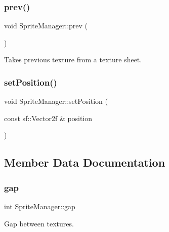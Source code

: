 \mbox{\label{class_sprite_manager_a45d2b2613bb95d34ce8e0ad28e261ef1}} 
\subsubsection{\texorpdfstring{prev()}{prev()}}
{\footnotesize\ttfamily void Sprite\+Manager\+::prev (\begin{DoxyParamCaption}{ }\end{DoxyParamCaption})}



Takes previous texture from a texture sheet. 

\mbox{\label{class_sprite_manager_a9ef427743db56baec20673d877a63717}} 
\subsubsection{\texorpdfstring{setPosition()}{setPosition()}}
{\footnotesize\ttfamily void Sprite\+Manager\+::set\+Position (\begin{DoxyParamCaption}\item[{const sf\+::\+Vector2f \&}]{position }\end{DoxyParamCaption})\hspace{0.3cm}{\ttfamily [inline]}}



\subsection{Member Data Documentation}
\mbox{\label{class_sprite_manager_a57bba66a27411c59651af826b50ec11d}} 
\subsubsection{\texorpdfstring{gap}{gap}}
{\footnotesize\ttfamily int Sprite\+Manager\+::gap\hspace{0.3cm}{\ttfamily [private]}}



Gap between textures. 

